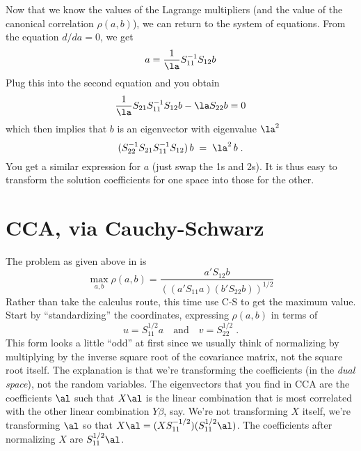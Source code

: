 \documentclass[12pt]{article}
\begin{document}
 Now that we know the values of the Lagrange multipliers (and the value of 
the canonical correlation $\rho(a,b)$), we can return to the
system of equations.  From the equation $d/da = 0$, we get
 \begin{displaymath}
    a = \frac{1}{\la} S_{11}^{-1} S_{12} b   
 \end{displaymath}
 Plug this into the second equation and you obtain
 \begin{displaymath}
   \frac{1}{\la} S_{21}S_{11}^{-1}S_{12} b - \la S_{22} b = 0
 \end{displaymath}
 which then implies that $b$ is an eigenvector with eigenvalue $\la^2$
 \begin{displaymath}
   (S_{22}^{-1} S_{21} S_{11}^{-1} S_{12}) \, b \; = \; \la^2 \, b \;.
 \end{displaymath}
 You get a similar expression for $a$ (just swap the 1s and 2s).  It is thus easy to transform the solution coefficients for one space into those for the other.


\section{CCA, via Cauchy-Schwarz}
\label{sec:ccacs}

The problem as given above in  is 
 \begin{equation}
    \max_{a,b} \rho(a,b)=
               \frac{a'S_{12}b}
                    {\left((a'S_{11}a)(b'S_{22}b)\right)^{1/2}}
 \end{equation}
 Rather than take the calculus route, this time use C-S to get the maximum
 value.  Start by ``standardizing'' the coordinates, expressing $\rho(a,b)$ in
 terms of
 \begin{displaymath}
     u = S_{11}^{1/2} a \quad \mbox{and} \quad  v = S_{22}^{1/2} \;.
 \end{displaymath}
 This form looks a little ``odd'' at first since we usually think of normalizing
 by multiplying by the inverse square root of the covariance matrix, not the
 square root itself. The explanation is that we're transforming the coefficients
 (in the {\em dual space}), not the random variables.  The eigenvectors that you
 find in CCA are the coefficients $\al$ such that $X \al$ is the linear
 combination that is most correlated with the other linear combination $Y
 \beta$, say.  We're not transforming $X$ itself, we're transforming $\al$ so
 that $X \al = (X S_{11}^{-1/2})(S_{11}^{1/2} \al)$. The coefficients after
 normalizing $X$ are $S_{11}^{1/2} \al$.
\end{document}
